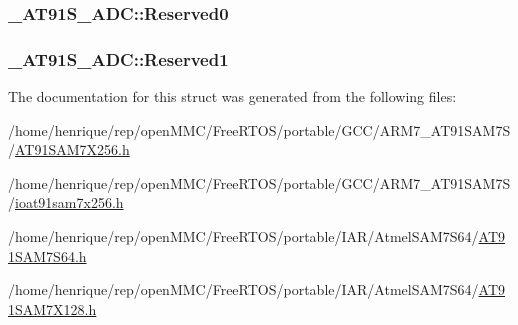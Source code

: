 \hypertarget{struct__AT91S__ADC_a03592001549aa6f76212d9fe5492f025}{
\subsubsection[{Reserved0}]{ \-\_\-\-A\-T91\-S\-\_\-\-A\-D\-C\-::\-Reserved0}}\label{struct__AT91S__ADC_a03592001549aa6f76212d9fe5492f025}
\hypertarget{struct__AT91S__ADC_ae30ceefa451decc6c570188f0645f2e2}{
\subsubsection[{Reserved1}]{ \-\_\-\-A\-T91\-S\-\_\-\-A\-D\-C\-::\-Reserved1}}\label{struct__AT91S__ADC_ae30ceefa451decc6c570188f0645f2e2}


The documentation for this struct was generated from the following files\-:\begin{DoxyCompactItemize}
\item 
/home/henrique/rep/open\-M\-M\-C/\-Free\-R\-T\-O\-S/portable/\-G\-C\-C/\-A\-R\-M7\-\_\-\-A\-T91\-S\-A\-M7\-S/\hyperlink{GCC_2ARM7__AT91SAM7S_2AT91SAM7X256_8h}{A\-T91\-S\-A\-M7\-X256.\-h}\item 
/home/henrique/rep/open\-M\-M\-C/\-Free\-R\-T\-O\-S/portable/\-G\-C\-C/\-A\-R\-M7\-\_\-\-A\-T91\-S\-A\-M7\-S/\hyperlink{ioat91sam7x256_8h}{ioat91sam7x256.\-h}\item 
/home/henrique/rep/open\-M\-M\-C/\-Free\-R\-T\-O\-S/portable/\-I\-A\-R/\-Atmel\-S\-A\-M7\-S64/\hyperlink{AT91SAM7S64_8h}{A\-T91\-S\-A\-M7\-S64.\-h}\item 
/home/henrique/rep/open\-M\-M\-C/\-Free\-R\-T\-O\-S/portable/\-I\-A\-R/\-Atmel\-S\-A\-M7\-S64/\hyperlink{AT91SAM7X128_8h}{A\-T91\-S\-A\-M7\-X128.\-h}\end{DoxyCompactItemize}
